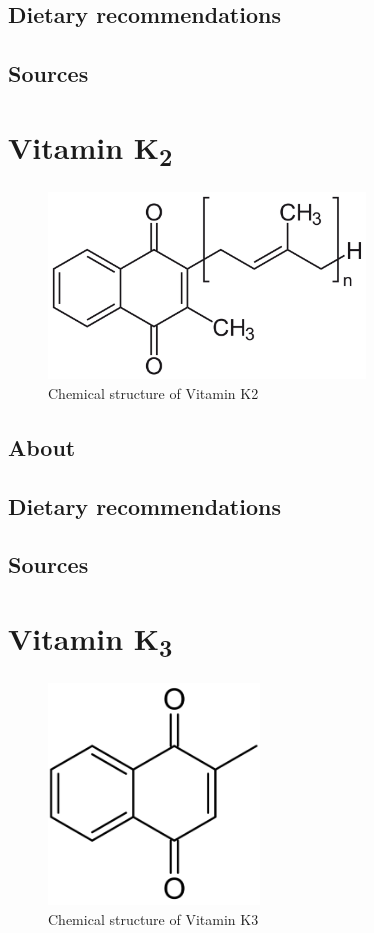 \documentclass{book}
\begin{document}
\section{Dietary recommendations}


\section{Sources}


\chapter{Vitamin K\textsubscript{2}}
\begin{figure}[h]
	\caption{Chemical structure of Vitamin K2}
	\centering \includegraphics[width=0.75\textwidth]{images/Vitamin_K2_chemical_structure}
\end{figure}
\newpage

\section{About}


\section{Dietary recommendations}


\section{Sources}


\chapter{Vitamin K\textsubscript{3}}
\begin{figure}[h]
	\caption{Chemical structure of Vitamin K3}
	\centering \includegraphics[width=0.5\textwidth]{images/Vitamin_K3_chemical_structure}
\end{figure}
\newpage
\end{document}

